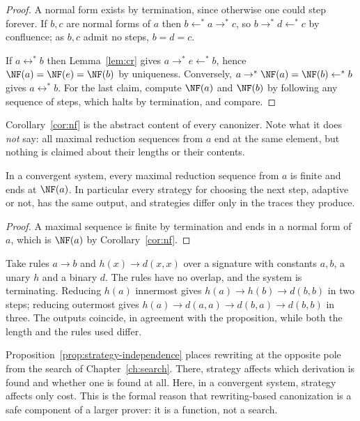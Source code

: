 \begin{proof}
A normal form exists by termination, since otherwise one could step forever. If $b,c$ are normal forms of $a$ then $b\leftarrow^{*}a\to^{*}c$, so $b\to^{*}d\leftarrow^{*}c$ by confluence; as $b,c$ admit no steps, $b=d=c$.

If $a\leftrightarrow^{*}b$ then Lemma~\ref{lem:cr} gives $a\to^{*}e\leftarrow^{*}b$, hence $\NF(a)=\NF(e)=\NF(b)$ by uniqueness. Conversely, $a\to^{*}\NF(a)=\NF(b)\leftarrow^{*}b$ gives $a\leftrightarrow^{*}b$. For the last claim, compute $\NF(a)$ and $\NF(b)$ by following any sequence of steps, which halts by termination, and compare.
\end{proof}

Corollary~\ref{cor:nf} is the abstract content of every canonizer. Note what it does \emph{not} say: all maximal reduction sequences from $a$ end at the same element, but nothing is claimed about their lengths or their contents.

\begin{proposition}
\label{prop:strategy-independence}
In a convergent system, every maximal reduction sequence from $a$ is finite and ends at $\NF(a)$. In particular every strategy for choosing the next step, adaptive or not, has the same output, and strategies differ only in the traces they produce.
\end{proposition}

\begin{proof}
A maximal sequence is finite by termination and ends in a normal form of $a$, which is $\NF(a)$ by Corollary~\ref{cor:nf}.
\end{proof}

\begin{example}
\label{ex:strategies}
Take rules $a\to b$ and $h(x)\to d(x,x)$ over a signature with constants $a,b$, a unary $h$ and a binary $d$. The rules have no overlap, and the system is terminating. Reducing $h(a)$ innermost gives $h(a)\to h(b)\to d(b,b)$ in two steps; reducing outermost gives $h(a)\to d(a,a)\to d(b,a)\to d(b,b)$ in three. The outputs coincide, in agreement with the proposition, while both the length and the rules used differ.
\end{example}

Proposition~\ref{prop:strategy-independence} places rewriting at the opposite pole from the search of Chapter~\ref{ch:search}. There, strategy affects which derivation is found and whether one is found at all. Here, in a convergent system, strategy affects only cost. This is the formal reason that rewriting-based canonization is a safe component of a larger prover: it is a function, not a search.

